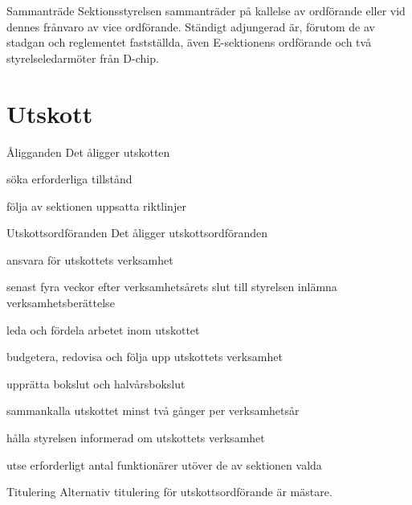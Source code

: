 \documentclass[pdfbookmarks,a4paper,11pt]{article}
\newlength{\itemcollength}
\newenvironment{reglemlista}{%
  \begin{list}{}{%
      \setlength{\labelwidth}{\itemcollength}%
      \setlength{\leftmargin}{\labelwidth + \labelsep}%
      \renewcommand{\makelabel}[1]{%
        \raisebox{0pt}[1ex][0pt]{%
          \makebox[\labelwidth][l]{%
            \parbox[t]{\itemcollength}{%
              \raggedright\hspace{0pt}##1}}}\hfill}%
      }}{%
  \end{list}}
\begin{document}
\begin{reglemlista}
    \item[Sammanträde]
    	Sektionsstyrelsen sammanträder på kallelse av ordförande eller vid dennes frånvaro av vice ordförande. Ständigt adjungerad är, förutom de av stadgan och reglementet fastställda, även E-sektionens ordförande och två styrelseledarmöter från D-chip.

\end{reglemlista}

\section{Utskott}

\begin{reglemlista}

  \item[Åligganden]
    Det åligger utskotten
    \begin{attlista}
      \item söka erforderliga tillstånd
      \item följa av sektionen uppsatta riktlinjer
    \end{attlista}

  \item[Utskottsordföranden]
    Det åligger utskottsordföranden
    \begin{attlista}
      \item ansvara för utskottets verksamhet
      \item senast fyra veckor efter verksamhetsårets slut till styrelsen inlämna verksamhetsberättelse
      \item leda och fördela arbetet inom utskottet
      \item budgetera, redovisa och följa upp utskottets verksamhet
      \item upprätta bokslut och halvårsbokslut
      \item sammankalla utskottet minst två gånger per verksamhetsår
      \item hålla styrelsen informerad om utskottets verksamhet
      \item utse erforderligt antal funktionärer utöver de av sektionen valda
    \end{attlista}

	\item[Titulering]
	Alternativ titulering för utskottsordförande är mästare.

\end{reglemlista}
\end{document}
